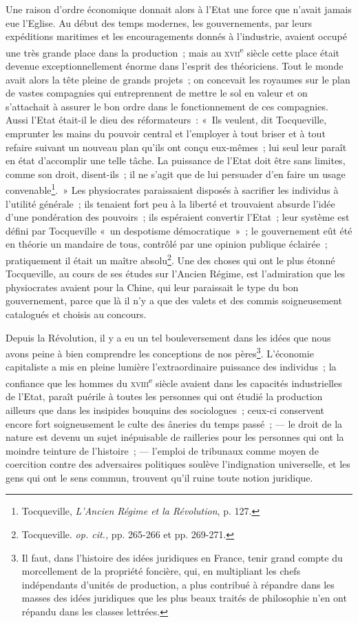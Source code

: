 \documentclass[french,twoside]{book} %
\begin{document}
\noindent Une raison d’ordre économique donnait alors à l’Etat une force que n’avait jamais eue l’Eglise. Au début des temps modernes, les gouvernements, par leurs expéditions maritimes et les encouragements donnés à l’industrie, avaient occupé une très grande place dans la production ; mais au {\scshape xvii}\textsuperscript{e} siècle cette place était devenue exceptionnellement énorme dans l’esprit des théoriciens. Tout le monde avait alors la tête pleine de grands projets ; on concevait les royaumes sur le plan de vastes compagnies qui entreprennent de mettre le sol en valeur et on s’attachait à assurer le bon ordre dans le fonctionnement de ces compagnies. Aussi l’Etat était-il le dieu des réformateurs : « Ils veulent, dit Tocqueville, emprunter les mains du pouvoir central et l’employer à tout briser et à tout refaire suivant un nouveau plan qu’ils ont conçu eux-mêmes ; lui seul leur paraît en état d’accomplir une telle tâche. La puissance de l’Etat doit être sans limites, comme son droit, disent-ils ; il ne s’agit que de lui persuader d’en faire un usage convenable\footnote{ \noindent Tocqueville, \emph{L’Ancien Régime et la Révolution}, p. 127.
 }. » Les physiocrates paraissaient disposés à sacrifier les individus  à l’utilité générale ; ils tenaient fort peu à la liberté et trouvaient absurde l’idée d’une pondération des pouvoirs ; ils espéraient convertir l’Etat ; leur système est défini par Tocqueville « un despotisme démocratique » ; le gouvernement eût été en théorie un mandaire de tous, contrôlé par une opinion publique éclairée ; pratiquement il était un maître absolu\footnote{ \noindent Tocqueville. \emph{op. cit.,} pp. 265-266 et pp. 269-271.
 }. Une des choses qui ont le plus étonné Tocqueville, au cours de ses études sur l’Ancien Régime, est l’admiration que les physiocrates avaient pour la Chine, qui leur paraissait le type du bon gouvernement, parce que là il n’y a que des valets et des commis soigneusement catalogués et choisis au concours.\par
Depuis la Révolution, il y a eu un tel bouleversement dans les idées que nous avons peine à bien comprendre les conceptions de nos pères\footnote{ \noindent Il faut, dans l’histoire des idées juridiques en France, tenir grand compte du morcellement de la propriété foncière, qui, en multipliant les chefs indépendants d’unités de production, a plus contribué à répandre dans les masses des idées juridiques que les plus beaux traités de philosophie n’en ont répandu dans les classes lettrées.
 }. L’économie capitaliste a mis en pleine lumière l’extraordinaire puissance des individus ; la confiance que les hommes du {\scshape xviii}\textsuperscript{e} siècle avaient dans les capacités industrielles de l’Etat, paraît puérile à toutes les personnes qui ont étudié la production ailleurs que dans les insipides bouquins des sociologues ; ceux-ci conservent encore fort soigneusement le culte des âneries du temps passé ; — le droit de la nature est devenu un sujet inépuisable de railleries pour les personnes  qui ont la moindre teinture de l’histoire ; — l’emploi de tribunaux comme moyen de coercition contre des adversaires politiques soulève l’indignation universelle, et les gens qui ont le sens commun, trouvent qu’il ruine toute notion juridique.\par
\end{document}
